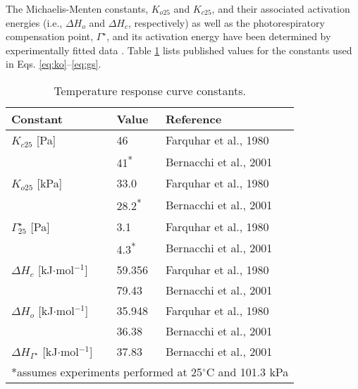 \noindent The Michaelis-Menten constants, $K_{o25}$ and $K_{c25}$, and their associated activation energies (i.e., $\Delta H_o$ and $\Delta H_c$, respectively) as well as the photorespiratory compensation point, $\Gamma^{\star}$, and its activation energy have been determined by experimentally fitted data \parencite{farquhar80, bernacchi01}.  
Table \ref{tab:michaelis} lists published values for the constants used in Eqs. \ref{eq:ko}--\ref{eq:gs}.
\begin{table}[h]
    \caption{Temperature response curve constants.}
    \label{tab:michaelis}
    \centering
    \begin{tabular}{l l l}
        \toprule
        \bf{Constant} & \bf{Value} & \bf{Reference} \\
        \toprule
        $K_{c25}$ [Pa] & 46 & Farquhar et al., 1980 \\
        
        ~ & 41\textsuperscript{*} & Bernacchi et al., 2001 \\
        
        $K_{o25}$ [kPa] & 33.0 & Farquhar et al., 1980 \\
        
        ~ & 28.2\textsuperscript{*} & Bernacchi et al., 2001 \\
        
        $\Gamma^{\star}_{25}$ [Pa] & 3.1 & Farquhar et al., 1980 \\
        
        ~ & 4.3\textsuperscript{*} & Bernacchi et al., 2001 \\
        
        $\Delta H_c$ [kJ$\cdot$mol$^{-1}$] & 59.356 & Farquhar et al., 1980 \\
        
        ~ & 79.43 & Bernacchi et al., 2001 \\
        
        $\Delta H_o$ [kJ$\cdot$mol$^{-1}$] & 35.948 & Farquhar et al., 1980 \\
        
        ~ & 36.38 & Bernacchi et al., 2001 \\
        
        $\Delta H_{\Gamma^{\star}}$ [kJ$\cdot$mol$^{-1}$] & 37.83 & Bernacchi et al., 2001\\
        
        \multicolumn{3}{l}{
        	\footnotesize{*assumes experiments performed at 
        	25$^{\circ}$C and 101.3 kPa}
        	}\\
        \bottomrule
    \end{tabular}
\end{table}

